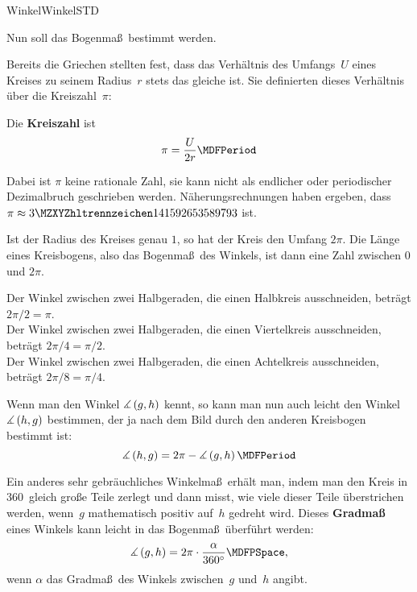 \begin{MXContent}{Winkel}{Winkel}{STD}

Nun soll das Bogenma\ss\ bestimmt werden.

Bereits die Griechen stellten fest, dass das Verh\"altnis des
Umfangs~$U$ eines Kreises zu seinem Radius~$r$ stets das gleiche ist.
Sie definierten dieses Verh\"altnis \"uber die Kreiszahl~$\pi$: 
\begin{MInfo}%
Die \textbf{Kreiszahl} ist
\[
    \pi = \frac{U}{2r} \MDFPeriod
\]

Dabei ist $\pi$ keine rationale Zahl, sie kann nicht als endlicher oder periodischer Dezimalbruch geschrieben werden. N\"aherungsrechnungen haben ergeben, dass
$\pi \approx \MZahl{3}{141592653589793}$ ist.
\end{MInfo}

Ist der Radius des Kreises genau $1$, so hat der Kreis den Umfang $2\pi$. Die L\"ange eines Kreisbogens, also das Bogenma\ss\ des Winkels, ist dann eine Zahl zwischen $0$ und $2\pi$.

\begin{MExample}
Der Winkel zwischen zwei Halbgeraden, die einen Halbkreis ausschneiden, betr\"agt $2\pi/2=\pi$.\\
Der Winkel zwischen zwei Halbgeraden, die einen Viertelkreis ausschneiden, betr\"agt $2\pi/4=\pi/2$.\\
Der Winkel zwischen zwei Halbgeraden, die einen Achtelkreis ausschneiden, betr\"agt $2\pi/8=\pi/4$.
\end{MExample}


Wenn man den Winkel $\measuredangle \left( g, h \right)$ kennt, so kann man nun auch leicht den Winkel $\measuredangle \left( h, g \right)$ bestimmen, der ja nach dem Bild  durch den anderen Kreisbogen bestimmt ist:
\[
   \Mmeasuredangle \left( h, g \right)
 = 2 \pi - \Mmeasuredangle \left( g, h \right) \MDFPeriod
\]


Ein anderes sehr gebr\"auchliches Winkelma\ss\ erh\"alt man, indem man den Kreis in 360~gleich
gro\ss e Teile zerlegt und dann misst, wie viele dieser Teile
\"uberstrichen werden, wenn~$g$ mathematisch positiv auf~$h$ gedreht wird.
Dieses \textbf{Gradma\ss} eines Winkels kann leicht in das
Bogenma\ss\ \"uberf\"uhrt werden:
\[
   \Mmeasuredangle \left( g, h \right)
 = 2 \pi \cdot \frac{\alpha}{360^{\circ}} \MDFPSpace,
\]
wenn $\alpha$ das Gradma\ss\ des Winkels zwischen~$g$ und~$h$ angibt.


\end{MXContent}
